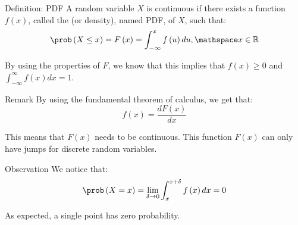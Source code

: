\documentclass[a4paper]{article}
\begin{document}
\begin{parag}{Definition: PDF}
    A random variable $X$ is continuous if there exists a function $f\left(x\right)$, called the  (or density), named PDF, of $X$, such that: 
    \[\prob\left(X \leq x\right) = F\left(x\right) = \int_{-\infty}^{x} f\left(u\right)du, \mathspace x \in \mathbb{R}\]
    
    By using the properties of $F$, we know that this implies that $f\left(x\right) \geq 0$ and $\int_{-\infty}^{\infty} f\left(x\right)dx = 1$.

    \begin{subparag}{Remark}
        By using the fundamental theorem of calculus, we get that: 
        \[f\left(x\right) = \frac{dF\left(x\right)}{dx}\]

        This means that $F\left(x\right)$ needs to be continuous. This function $F\left(x\right)$ can only have jumps for discrete random variables.
    \end{subparag}

    \begin{subparag}{Observation}
        We notice that: 
        \[\prob\left(X = x\right) = \lim_{\delta \to 0} \int_{x}^{x + \delta} f\left(x\right)dx = 0\]

        As expected, a single point has zero probability.
    \end{subparag}
\end{parag}
\end{document}
